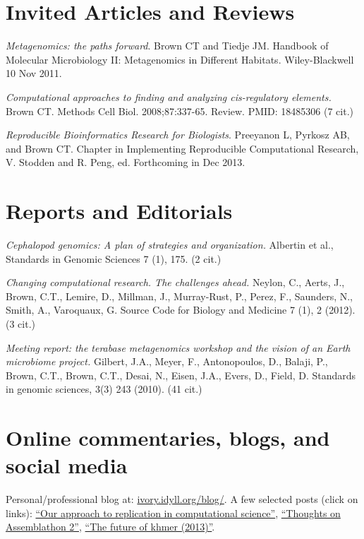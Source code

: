 \documentclass[margin,line]{resume}
\begin{document}
\begin{resume}
\section{\mysidestyle Invited Articles and Reviews}

{\em Metagenomics: the paths forward}.  Brown CT and Tiedje JM.
Handbook of Molecular Microbiology II: Metagenomics in Different
Habitats.  Wiley-Blackwell 10 Nov 2011.

{\em Computational approaches to finding and analyzing cis-regulatory elements.} 
Brown CT. Methods Cell Biol. 2008;87:337-65. Review.
PMID: 18485306  (7 cit.)

{\em Reproducible Bioinformatics Research for Biologists}.  Preeyanon
L, Pyrkosz AB, and Brown CT. Chapter in Implementing Reproducible
Computational Research, V. Stodden and R. Peng, ed.  Forthcoming in
Dec 2013.

\section{\mysidestyle Reports and Editorials}

{\em Cephalopod genomics: A plan of strategies and organization.} Albertin et al., Standards in Genomic Sciences 7 (1), 175. (2 cit.)

{\em Changing computational research. The challenges ahead.}
Neylon, C., Aerts, J., Brown, C.T., Lemire, D., Millman, J., Murray-Rust, P., Perez, F., Saunders, N., Smith, A., Varoquaux, G.
Source Code for Biology and Medicine 7 (1), 2 (2012). (3 cit.)

{\em Meeting report: the terabase metagenomics workshop and the vision of an Earth microbiome project.}
Gilbert, J.A., Meyer, F., Antonopoulos, D., Balaji, P., Brown, C.T., Brown, C.T., Desai, N., Eisen, J.A., Evers, D., Field, D. Standards in genomic sciences, 3(3) 243 (2010). (41 cit.)

\section{\mysidestyle Online commentaries, blogs, and social media}

Personal/professional blog at: \href{http://ivory.idyll.org/blog/}{ivory.idyll.org/blog/}.  A few selected posts (click on links): \href{http://ivory.idyll.org/blog/replication-i.html}{``Our approach to replication in computational science''}, \href{http://ivory.idyll.org/blog/thoughts-on-assemblathon-2.html}{``Thoughts on Assemblathon 2''}, \href{http://ivory.idyll.org/blog/the-future-of-khmer-2013-version.html}{``The future of khmer (2013)''}.


\end{resume}
\end{document}
